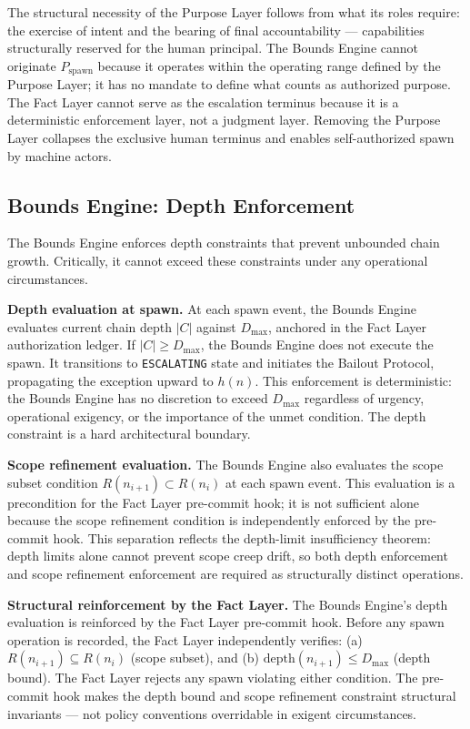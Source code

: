 The structural necessity of the Purpose Layer follows from what its roles require: the exercise of intent and the bearing of final accountability — capabilities structurally reserved for the human principal. The Bounds Engine cannot originate $P_{\mathrm{spawn}}$ because it operates within the operating range defined by the Purpose Layer; it has no mandate to define what counts as authorized purpose. The Fact Layer cannot serve as the escalation terminus because it is a deterministic enforcement layer, not a judgment layer. Removing the Purpose Layer collapses the exclusive human terminus and enables self-authorized spawn by machine actors.

\subsection{Bounds Engine: Depth Enforcement}
\label{sec:rs-bounds-depth}

The Bounds Engine enforces depth constraints that prevent unbounded chain growth. Critically, it cannot exceed these constraints under any operational circumstances.

\medskip
\noindent\textbf{Depth evaluation at spawn.} At each spawn event, the Bounds Engine evaluates current chain depth $|C|$ against $D_{\mathrm{max}}$, anchored in the Fact Layer authorization ledger. If $|C| \geq D_{\mathrm{max}}$, the Bounds Engine does not execute the spawn. It transitions to \texttt{ESCALATING} state and initiates the Bailout Protocol, propagating the exception upward to $h(n)$. This enforcement is deterministic: the Bounds Engine has no discretion to exceed $D_{\mathrm{max}}$ regardless of urgency, operational exigency, or the importance of the unmet condition. The depth constraint is a hard architectural boundary.

\medskip
\noindent\textbf{Scope refinement evaluation.} The Bounds Engine also evaluates the scope subset condition $R(n_{i+1}) \subset R(n_i)$ at each spawn event. This evaluation is a precondition for the Fact Layer pre-commit hook; it is not sufficient alone because the scope refinement condition is independently enforced by the pre-commit hook. This separation reflects the depth-limit insufficiency theorem: depth limits alone cannot prevent scope creep drift, so both depth enforcement and scope refinement enforcement are required as structurally distinct operations.

\medskip
\noindent\textbf{Structural reinforcement by the Fact Layer.} The Bounds Engine's depth evaluation is reinforced by the Fact Layer pre-commit hook. Before any spawn operation is recorded, the Fact Layer independently verifies: (a) $R(n_{i+1}) \subseteq R(n_i)$ (scope subset), and (b) $\mathrm{depth}(n_{i+1}) \leq D_{\mathrm{max}}$ (depth bound). The Fact Layer rejects any spawn violating either condition. The pre-commit hook makes the depth bound and scope refinement constraint structural invariants — not policy conventions overridable in exigent circumstances.

